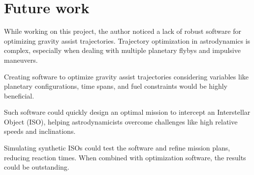 \section{Future work}

While working on this project, the author noticed a lack of robust software for
optimizing gravity assist trajectories. Trajectory optimization in astrodynamics
is complex, especially when dealing with multiple planetary flybys and impulsive
maneuvers.

Creating software to optimize gravity assist trajectories considering variables
like planetary configurations, time spans, and fuel constraints would be highly
beneficial.

Such software could quickly design an optimal mission to intercept an
Interstellar Object (ISO), helping astrodynamicists overcome challenges like
high relative speeds and inclinations.

Simulating synthetic ISOs could test the software and refine mission plans,
reducing reaction times. When combined with optimization software, the results
could be outstanding.
